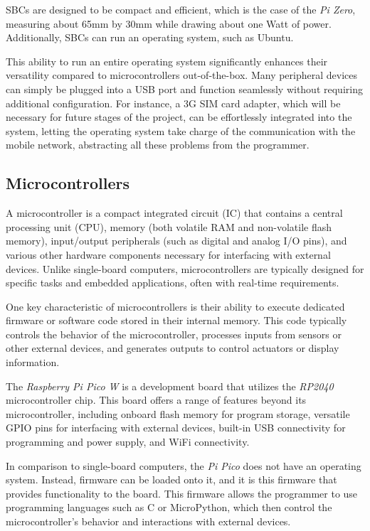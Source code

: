 SBCs are designed to be compact and efficient, which is the case of the \textit{Pi Zero}, measuring about 65mm by 
30mm while drawing about one Watt of power. Additionally, SBCs can run an operating system, such as Ubuntu.

This ability to run an entire operating system significantly enhances their versatility compared to microcontrollers 
out-of-the-box. Many peripheral devices can simply be plugged into a USB port and function seamlessly without 
requiring additional configuration. For instance, a 3G SIM card adapter, which will be necessary for future stages 
of the project, can be effortlessly integrated into the system, letting the operating system take charge of the 
communication with the mobile network, abstracting all these problems from the programmer.


%
%
\subsection{Microcontrollers}

A microcontroller is a compact integrated circuit (IC) that contains a central processing unit (CPU), memory (both 
volatile RAM and non-volatile flash memory), input/output peripherals (such as digital and analog I/O pins), and 
various other hardware components necessary for interfacing with external devices. Unlike single-board computers, 
microcontrollers are typically designed for specific tasks and embedded applications, often with real-time requirements.

One key characteristic of microcontrollers is their ability to execute dedicated firmware or software code stored in 
their internal memory. This code typically controls the behavior of the microcontroller, processes inputs from sensors 
or other external devices, and generates outputs to control actuators or display information.

The \textit{Raspberry Pi Pico W} is a development board that utilizes the \textit{RP2040} microcontroller chip. This board 
offers a range of features beyond its microcontroller, including onboard flash memory for program storage, versatile 
GPIO pins for interfacing with external devices, built-in USB connectivity for programming and power supply, and 
WiFi connectivity.

In comparison to single-board computers, the \textit{Pi Pico} does not have an operating system. Instead, firmware can be 
loaded onto it, and it is this firmware that provides functionality to the board. This firmware allows the programmer to 
use programming languages such as C or MicroPython, which then control the microcontroller's behavior and interactions with 
external devices.

